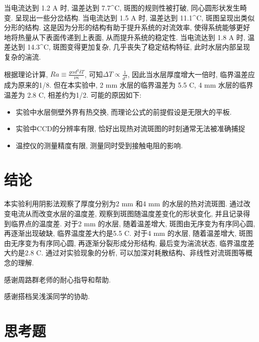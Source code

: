 \documentclass[font=default]{mpltx}
\newcommand{\note}[1]{{\color{gray}#1}}
\newcommand*\env[1]{\textit{\texttt{#1}}}
\begin{document}
  \par
  当电流达到 1.2 A 时, 温差达到 7.7^\circ C, 斑图的规则性被打破, 同心圆形状发生畸变. 呈现出一些分岔结构. 
  当电流达到 1.5 A 时, 温差达到 11.1^\circ C, 斑图呈现出类似分形的结构. 这是因为分形的结构有助于提升系统的对流效率, 使得系统能够更好地将热量从下表面传递到上表面, 从而提升系统的稳定性.
  当电流达到 1.8 A 时, 温差达到 14.3^\circ C, 斑图变得更加复杂, 几乎丧失了稳定结构特征, 此时水层内部呈现复杂的湍流.

  \par
  根据理论计算, $Ra\equiv\frac{g\alpha d^3\delta T}{\nu\kappa}$, 可知$\Delta T \propto \frac{1}{d^3}$, 因此当水层厚度增大一倍时, 临界温差应成为原来的1/8.
  但在本实验中, 2 mm 水层的临界温差为 5.5 \circ C, 4 mm 水层的临界温差为 2.8 \circ C, 相差约为1/2. 可能的原因如下:
  \begin{itemize}
    \item 实验中水层侧壁外界有热交换, 而理论公式的前提假设是无限大的平板.
    \item 实验中CCD的分辨率有限, 恰好出现热对流斑图的时刻通常无法被准确捕捉
    \item 温控仪的测量精度有限, 测量同时受到接触电阻的影响.
  \end{itemize}


\section{结论}
  本实验利用阴影法观察了厚度分别为2 mm 和4 mm 的水层的热对流斑图. 通过改变电流从而改变水层的温度差, 观察到斑图随温度差变化的形状变化, 并且记录得到临界点的温度差. 
  对于2 mm 的水层, 随着温差增大, 斑图由无序变为有序同心圆, 再逐渐出现破缺, 临界温度差大约是5.5 \circ C.
  对于4 mm 的水层, 随着温差增大, 斑图由无序变为有序同心圆, 再逐渐分裂形成分形结构, 最后变为湍流状态, 临界温度差大约是2.8 \circ C.
  通过对实验现象的分析, 可以加深对耗散结构、非线性对流斑图等概念的理解.

\begin{acknowledgments}
  感谢周路群老师的耐心指导和帮助.
  \par
  感谢搭档吴浅溪同学的协助.
\end{acknowledgments}



\clearpage %
\appendix %
\section{思考题}\label{app:exercise}
\end{document}

